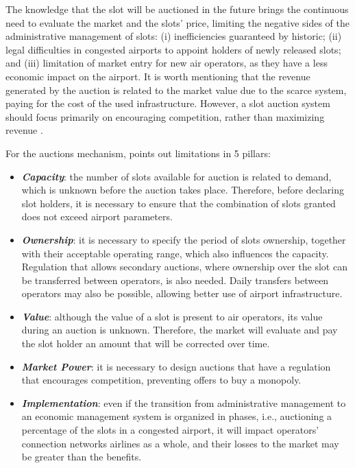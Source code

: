 The knowledge that the slot will be auctioned in the future brings the continuous need to evaluate the market and the slots’ price, limiting the negative sides of the administrative management of slots: (i) inefficiencies guaranteed by historic; (ii) legal difficulties in congested airports to appoint holders of newly released slots; and (iii) limitation of market entry for new air operators, as they have a less economic impact on the airport. It is worth mentioning that the revenue generated by the auction is related to the market value due to the scarce system, paying for the cost of the used infrastructure. However, a slot auction system should focus primarily on encouraging competition, rather than maximizing revenue \cite{ball2006auctions}.

For the auctions mechanism, \cite{ball2006auctions} points out limitations in 5 pillars:
\begin{itemize}
\item \textbf{\textit{Capacity}}: the number of slots available for auction is related to demand, which is unknown before the auction takes place. Therefore, before declaring slot holders, it is necessary to ensure that the combination of slots granted does not exceed airport parameters.
\item \textit{\textbf{Ownership}}: it is necessary to specify the period of slots ownership, together with their acceptable operating range, which also influences the capacity. Regulation that allows secondary auctions, where ownership over the slot can be transferred between operators, is also needed. Daily transfers between operators may also be possible, allowing better use of airport infrastructure.
\item \textbf{\textit{Value}}: although the value of a slot is present to air operators, its value during an auction is unknown. Therefore, the market will evaluate and pay the slot holder an amount that will be corrected over time.
\item \textbf{\textit{Market Power}}: it is necessary to design auctions that have a regulation that encourages competition, preventing offers to buy a monopoly.
\item \textbf{\textit{Implementation}}: even if the transition from administrative management to an economic management system is organized in phases, i.e., auctioning a percentage of the slots in a congested airport, it will impact operators' connection networks airlines as a whole, and their losses to the market may be greater than the benefits.
\end{itemize}

